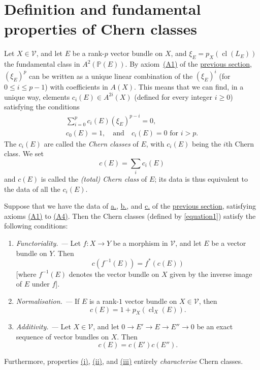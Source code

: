 \documentclass{article}
\theoremstyle{plain}
\newenvironment{theorem}[1]
    {\renewcommand\theinnercustomtheorem{#1}\innercustomtheorem}
    {\endinnercustomtheorem}
\theoremstyle{definition}
\newcommand{\cat}{\mathcal}
\renewcommand{\geq}{\geqslant}
\renewcommand{\leq}{\leqslant}
\DeclareMathOperator{\cl}{cl}
\begin{document}
\section{Definition and fundamental properties of Chern classes}
\label{section3}

Let $X\in\cat{V}$, and let $E$ be a rank-$p$ vector bundle on $X$, and $\xi_E=p_X(\cl(L_E))$ the fundamental class in $A^2(\mathbb{P}(E))$.
By axiom~\hyperref[axiomA1]{(A1)} of the \hyperref[section2]{previous section}, $(\xi_E)^p$ can be written as a unique linear combination of the $(\xi_E)^i$ (for $0\leq i\leq p-1$) with coefficients in $A(X)$.
This means that we can find, in a unique way, elements $c_i(E)\in A^{2i}(X)$ (defined for every integer $i\geq0$) satisfying the conditions
\[
\label{equation1}
  \begin{gathered}
    \sum_{i=0}^p c_i(E)(\xi_E)^{p-i} = 0,
  \\c_0(E)=1,\quad\text{and}\quad c_i(E)=0\mbox{ for $i>p$.}
  \end{gathered}
\tag{1}
\]
The $c_i(E)$ are called the \emph{Chern classes} of $E$, with $c_i(E)$ being the $i$th Chern class.
We set
\[
\label{equation2}
  c(E) = \sum_i c_i(E)
\tag{2}
\]
and $c(E)$ is called the \emph{(total) Chern class} of $E$;
its data is thus equivalent to the data of all the $c_i(E)$.

\begin{theorem}{1}
\label{theorem1}
  Suppose that we have the data of \hyperref[dataa]{\rm{a.}}, \hyperref[datab]{\rm{b.}}, and \hyperref[datac]{\rm{c.}} of the \hyperref[section2]{previous section}, satisfying axioms \hyperref[axiomA1]{\rm{(A1)}} to \hyperref[axiomA4]{\rm{(A4)}}.
  Then the Chern classes (defined by \cref{equation1}) satisfy the following conditions:
  \begin{enumerate}[\rm(i)]
    \item\label{theorem1i}
      \emph{Functoriality. ---}
      Let $f\colon X\to Y$ be a morphism in $\cat{V}$, and let $E$ be a vector bundle on $Y$.
      Then
      \[
      \label{equation3}
        c(f^{-1}(E)) = f^*(c(E))
      \tag{3}
      \]
      [where $f^{-1}(E)$ denotes the vector bundle on $X$ given by the inverse image of $E$ under $f$].
    \item\label{theorem1ii}
      \emph{Normalisation. ---}
      If $E$ is a rank-$1$ vector bundle on $X\in\cat{V}$, then
      \[
      \label{equation4}
        c(E) = 1+p_X(\cl_X(E)).
      \tag{4}
      \]
    \item\label{theorem1iii}
      \emph{Additivity. ---}
      Let $X\in\cat{V}$, and let $0\to E'\to E\to E''\to 0$ be an exact sequence of vector bundles on $X$.
      Then
      \[
      \label{equation5}
        c(E) = c(E')c(E'').
      \tag{5}
      \]
  \end{enumerate}

  Furthermore, properties \hyperref[theorem1i]{\rm{(i)}}, \hyperref[theorem1ii]{\rm{(ii)}}, and \hyperref[theorem1iii]{\rm{(iii)}} entirely \emph{characterise} Chern classes.
\end{theorem}
\end{document}
